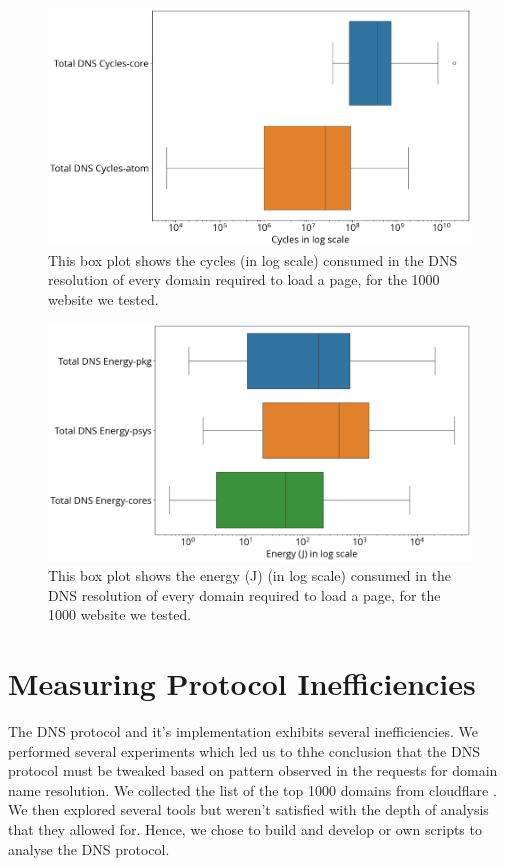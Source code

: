 \documentclass[conference]{IEEEtran}
\begin{document}
\begin{figure}[htbp]
    \centering
    \includegraphics[width=0.9\linewidth]{images/cycles.png}
    \caption{This box plot shows the cycles (in log scale) consumed in the DNS resolution of every domain required to load a page, for the 1000 website we tested.}
    \label{fig:dns-cycles}
\end{figure}
\begin{figure}[htbp]
    \centering
    \includegraphics[width=0.9\linewidth]{images/energy.png}
    \caption{This box plot shows the energy (J) (in log scale) consumed in the DNS resolution of every domain required to load a page, for the 1000 website we tested.}
    \label{fig:dns-energy}
\end{figure}

\section{Measuring Protocol Inefficiencies}
\label{Measuring Protocol Inefficiencies}
The DNS protocol and it's implementation exhibits several inefficiencies. We performed several experiments which led us to thhe conclusion that the DNS protocol must be tweaked based on pattern observed in the requests for domain name resolution. We collected the list of the top 1000 domains from cloudflare \cite{cloudflare}. We then explored several tools but weren't satisfied with the depth of analysis that they allowed for. Hence, we chose to build and develop or own scripts to analyse the DNS protocol. 
\end{document}
